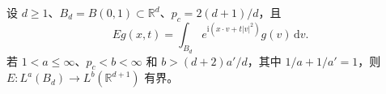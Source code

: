 设 $d\geq1$、$B_d=B(0,1)\subset\mathbb R^d$、$p_c=2(d+1)/d$，且
\[
Eg(x,t)=\int_{B_d}e^{\mathrm i(x\cdot v+t|v|^2)}g(v)\,\mathrm dv.
\]
若 $1<a\leq\infty$、$p_c<b<\infty$ 和 $b>(d+2)a'/d$，其中 $1/a+1/a'=1$，则 $E:L^a(B_d)\to L^b(\mathbb R^{d+1})$ 有界。
